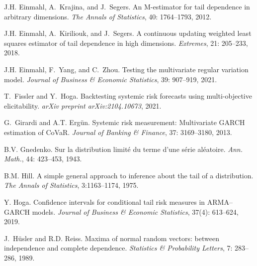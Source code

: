 \documentclass[11pt,letterpaper]{article}
\numberwithin{equation}{section}
\begin{document}
\begin{thebibliography}{29}
J.H. Einmahl, A.~Krajina, and J.~Segers.
\newblock An {M}-estimator for tail dependence in arbitrary dimensions.
\newblock \emph{The Annals of Statistics}, 40: 1764--1793, 2012.

J.H. Einmahl, A.~Kiriliouk, and J.~Segers.
\newblock A continuous updating weighted least squares estimator of tail dependence in high dimensions.
\newblock \emph{Extremes}, 21: 205--233, 2018.





J.H. Einmahl, F.~Yang, and C.~Zhou.
\newblock Testing the multivariate regular variation model.
\newblock \emph{Journal of Business \& Economic Statistics}, 39: 907--919, 2021.


T.~Fissler and Y.~Hoga.
\newblock Backtesting systemic risk forecasts using multi-objective
  elicitability.
\newblock \emph{arXiv preprint arXiv:2104.10673}, 2021.



G.~Girardi and A.T. Erg{\"u}n.
\newblock Systemic risk measurement: Multivariate {GARCH} estimation of
  {CoVaR}.
\newblock \emph{Journal of Banking \& Finance}, 37: 3169--3180, 2013.

B.V. Gnedenko.
\newblock Sur la distribution limit\'e du terme d'une s\'erie al\'eatoire.
\newblock \emph{Ann. Math.}, 44: 423--453, 1943.

B.M. Hill.
\newblock A simple general approach to inference about the tail of a
  distribution.
\newblock \emph{The Annals of Statistics}, 3:1163--1174, 1975.


Y. Hoga.
\newblock Confidence intervals for conditional tail risk measures in ARMA--GARCH models.
\newblock \emph{Journal of Business \& Economic Statistics}, 37(4): 613--624, 2019.



J.~H{\"u}sler and R.D. Reiss.
\newblock Maxima of normal random vectors: between independence and complete
  dependence.
\newblock \emph{Statistics \& Probability Letters}, 7: 283--286, 1989.


\end{thebibliography}
\end{document}
